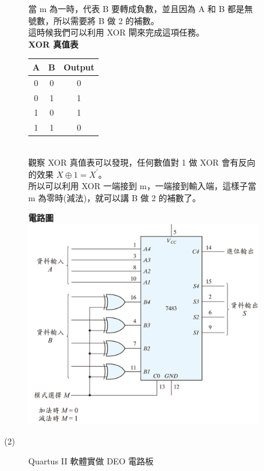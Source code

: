 \documentclass[12pt, a4paper]{article}
\begin{document}
\begin{description}
\begin{description}
\begin{description}
                \begin{samepage}
                  \fontsize{16pt}{18pt}
                    當 m 為一時，代表 B 要轉成負數，並且因為 A 和 B 都是無號數，所以需要將 B 做 2 的補數。
                    \\這時候我們可以利用 XOR 閘來完成這項任務。\\[.5cm]
                    \bf{XOR 真值表}\\[.3cm]
                      \normalfont
                      \begin{tabular}{|c|c|c|}
                        \hline
                        A & B & Output \\
                        \hline
                        0 & 0 & 0 \\
                        \hline
                        0 & 1 & 1 \\
                        \hline
                        1 & 0 & 1 \\
                        \hline
                        1 & 1 & 0 \\
                        \hline
                      \end{tabular}
                      \\[.4cm] 觀察 XOR 真值表可以發現，任何數值對 1 做 XOR 會有反向的效果  $X \oplus 1 = X^{'}$。
                      \\ 所以可以利用 XOR 一端接到 m，一端接到輸入端，這樣子當 m 為零時(減法)，就可以講 B 做 2 的補數了。\\
                \end{samepage}
    
                  \bf {電路圖} \\             
                  \includegraphics[width=12cm]{./image/7483.png}
                  \normalfont
              \item [(2)] Quartus II 軟體實做 DEO 電路板 \\[6cm]
              

\end{description}
\end{description}
\end{description}
\end{document}
